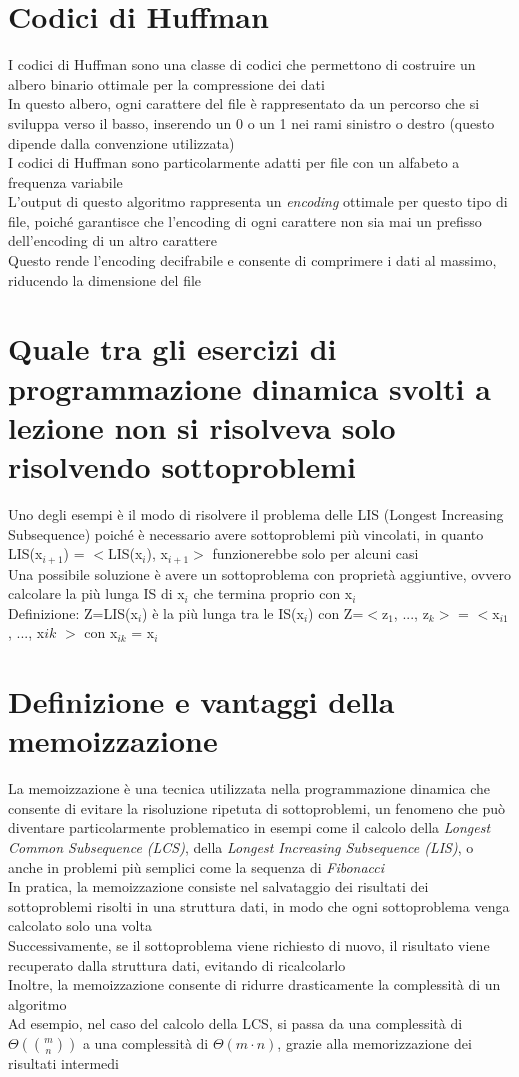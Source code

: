 \documentclass[12pt,oneside,a4paper]{article}
\begin{document}
\section{Codici di Huffman}
I codici di Huffman sono una classe di codici che permettono di costruire un albero binario ottimale per la compressione dei dati\\
In questo albero, ogni carattere del file è rappresentato da un percorso che si sviluppa verso il basso, inserendo un 0 o un 1 nei rami sinistro o destro (questo dipende dalla convenzione utilizzata)\\
I codici di Huffman sono particolarmente adatti per file con un alfabeto a frequenza variabile\\
L'output di questo algoritmo rappresenta un \textit{encoding} ottimale per questo tipo di file, poiché garantisce che l'encoding di ogni carattere non sia mai un prefisso dell'encoding di un altro carattere\\
Questo rende l'encoding decifrabile e consente di comprimere i dati al massimo, riducendo la dimensione del file
\section{Quale tra gli esercizi di programmazione dinamica svolti a lezione non si risolveva solo risolvendo sottoproblemi}
Uno degli esempi è il modo di risolvere il problema delle LIS (Longest Increasing Subsequence) poiché è necessario avere sottoproblemi più vincolati, in quanto LIS(x$_{i+1}$) = $<$LIS(x$_{i}$), x$_{i+1}$$>$ funzionerebbe solo per alcuni casi\\
Una possibile soluzione è avere un sottoproblema con proprietà aggiuntive, ovvero calcolare la più lunga IS di x$_i$ che termina proprio con x$_i$\\
Definizione: Z=LIS(x$_i$) è la più lunga tra le IS(x$_i$) con Z=$<$z$_1$, ..., z$_k$$>$ = $<$x$_{i1}$, ..., x$ik$ $>$ con x$_{ik}$ = x$_i$
\section{Definizione e vantaggi della memoizzazione}
La memoizzazione è una tecnica utilizzata nella programmazione dinamica che consente di evitare la risoluzione ripetuta di sottoproblemi, un fenomeno che può diventare particolarmente problematico in esempi come il calcolo della \textit{Longest Common Subsequence (LCS)}, della \textit{Longest Increasing Subsequence (LIS)}, o anche in problemi più semplici come la sequenza di \textit{Fibonacci}\\
In pratica, la memoizzazione consiste nel salvataggio dei risultati dei sottoproblemi risolti in una struttura dati, in modo che ogni sottoproblema venga calcolato solo una volta\\
Successivamente, se il sottoproblema viene richiesto di nuovo, il risultato viene recuperato dalla struttura dati, evitando di ricalcolarlo\\
Inoltre, la memoizzazione consente di ridurre drasticamente la complessità di un algoritmo\\
Ad esempio, nel caso del calcolo della LCS, si passa da una complessità di \( \Theta\left( \binom{m}{n} \right) \) a una complessità di \( \Theta(m \cdot n) \), grazie alla memorizzazione dei risultati intermedi
\end{document}
